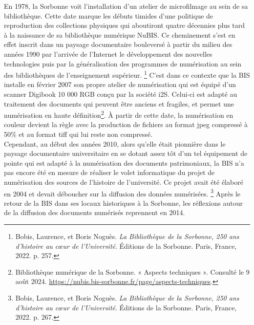 \documentclass[a4paper,12pt,twoside]{book}
\begin{document}
En 1978, la Sorbonne voit l'installation d'un atelier de microfilmage au sein de sa bibliothèque. Cette date marque les débuts timides d'une politique de reproduction des collections physiques qui aboutiront quatre décennies plus tard à la naissance de sa bibliothèque numérique NuBIS. Ce cheminement s'est en effet inscrit dans un paysage documentaire bouleversé à partir du milieu des années 1990 par l'arrivée de l'Internet le développement des nouvelles technologies puis par la généralisation des programmes de numérisation au sein des bibliothèques de l'enseignement supérieur. \footnote{Bobis, Laurence, et Boris Noguès. \emph{La Bibliothèque de la Sorbonne, 250 ans d’histoire au cœur de l’Université}. Éditions de la Sorbonne. Paris, France, 2022. p. 257.} C'est dans ce contexte que la BIS installe en février 2007 son
propre atelier de numérisation qui est équipé d'un scanner Digibook 10 000 RGB conçu par la société i2S. Celui-ci est adapté au traitement des
documents qui peuvent être anciens et fragiles, et permet une numérisation en haute définition\footnote{Bibliothèque
	numérique de la Sorbonne. « Aspects techniques ». Consulté le 9 août
	2024.
	\url{https://nubis.bis-sorbonne.fr/page/aspects-techniques}.}. À partir de cette date, la numérisation en couleur devient la règle avec la production de fichiers au format jpeg compressé à 50\% et au format tiff qui lui reste non compressé. \\

Cependant, au début des années 2010, alors qu'elle était pionnière dans le paysage documentaire universitaire en se dotant assez tôt d'un tel équipement de pointe qui est adapté à la numérisation des documents patrimoniaux, la BIS n'a pas encore été en mesure de réaliser le volet informatique du projet de numérisation des sources de l'histoire de l'université. Ce projet avait été élaboré en 2004 et devait déboucher sur la diffusion des données numérisées. \footnote{Bobis, Laurence, et Boris Noguès. \emph{La Bibliothèque de la Sorbonne, 250 ans d’histoire au cœur de l’Université}. Éditions de la Sorbonne. Paris, France, 2022. p. 267.} Après le retour de la BIS dans ses locaux historiques à la Sorbonne, les réflexions autour de la diffusion des documents numérisés reprennent en 2014. \\
\end{document}
